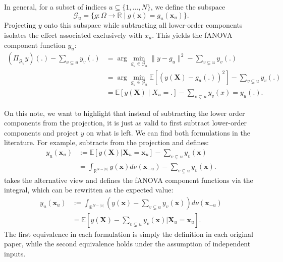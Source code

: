 In general, for a subset of indices $u \subseteq \{1, \dots, N\}$, we define the subspace
\[
\mathcal{G}_u = \{ g : \Omega \to \mathbb{R} \mid g(\boldsymbol{x}) = g_u(\boldsymbol{x}_u)\}.
\]
Projecting $y$ onto this subspace while subtracting all lower-order components 
isolates the effect associated exclusively with $x_u$. This yields the fANOVA component function $y_u$:
\begin{align*}
    (\Pi_{\mathcal{G}_u}y)(.) - \sum_{v \subsetneq u} y_v(.)
    &= \arg \min_{g_u \in \mathcal{G}_u} \|y - g_u\|^2 - \sum_{v \subsetneq u} y_v(.)\\
    &= \arg \min_{g_u \in \mathcal{G}_{u}} \mathbb{E}[(y(\boldsymbol{X}) - g_u(.))^2] - \sum_{v \subsetneq u} y_v(.)\\
    &= \mathbb{E}[y(\boldsymbol{X}) \mid X_{u} = .] - \sum_{v \subsetneq u} y_v(x) = y_u(.).
\end{align*}

On this note, we want to highlight that instead of subtracting the lower order components from the projection, it is just as valid to first subtract lower-order components and project $y$ on what is left.
We can find both formulations in the literature.
For example, \cite{muehlenstaedt2012} subtracts from the projection and defines:
\begin{align*}
    y_u(\boldsymbol{x}_u) &:=
    \mathbb{E}[y(\boldsymbol{X}) | \boldsymbol{X}_{u} = \boldsymbol{x}_u] - \sum_{v \subsetneq u} y_v(\boldsymbol{x}) \\
    &= \int_{\mathbb{R}^{N-|u|}} y(\boldsymbol{x}) d \nu(\boldsymbol{x}_{-u}) - \sum_{v \subsetneq u} y_v(\boldsymbol{x}).
\end{align*}
\cite{hooker2004} takes the alternative view and defines the fANOVA component functions via the integral, which can be rewritten as the expected value:
\begin{align*}
    y_u(\boldsymbol{x}_u)
    &:= \int_{\mathbb{R}^{N-|u|}} (y(\boldsymbol{x}) - \sum_{v \subsetneq u} y_v(\boldsymbol{x})) d \nu(\boldsymbol{x}_{-u}) \\
    &= \mathbb{E}[y(\boldsymbol{X}) - \sum_{v \subsetneq u} y_v(\boldsymbol{x}) | \boldsymbol{X}_{u} = \boldsymbol{x}_u ].
\end{align*}
The first equivalence in each formulation is simply the definition in each original paper, while the second equivalence holds under the assumption of independent inputs.


